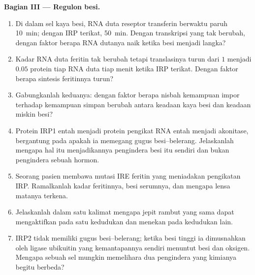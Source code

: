 \begin{problem}
\medskip
\noindent\textbf{Bagian III --- Regulon besi.}
\begin{enumerate}[resume]
  \item Di dalam sel kaya besi, RNA duta reseptor transferin berwaktu
        paruh \qty{10}{min}; dengan IRP terikat, \qty{50}{min}.
        Dengan transkripsi yang tak berubah, dengan faktor berapa RNA
        dutanya naik ketika besi menjadi langka?
  \item Kadar RNA duta feritin tak berubah tetapi translasinya
        turun dari $1$ menjadi $0.05$ protein tiap RNA duta tiap menit
        ketika IRP terikat. Dengan faktor berapa sintesis feritinnya turun?
  \item Gabungkanlah keduanya: dengan faktor berapa nisbah kemampuan impor
        terhadap kemampuan simpan berubah antara keadaan kaya besi dan
        keadaan miskin besi?
  \item Protein IRP1 entah menjadi protein pengikat RNA entah menjadi
        akonitase, bergantung pada apakah ia memegang gugus besi--belerang.
        Jelaskanlah mengapa hal itu menjadikannya pengindera besi itu
        sendiri dan bukan pengindera sebuah hormon.
  \item Seorang pasien membawa mutasi IRE feritin yang meniadakan
        pengikatan IRP. Ramalkanlah kadar feritinnya, besi serumnya, dan
        mengapa lensa matanya terkena.
  \item Jelaskanlah dalam satu kalimat mengapa jepit rambut yang sama dapat
        mengaktifkan pada satu kedudukan dan menekan pada kedudukan lain.
  \item IRP2 tidak memiliki gugus besi--belerang; ketika besi tinggi ia
        dimusnahkan oleh ligase ubikuitin yang kemantapannya sendiri
        menuntut besi dan oksigen. Mengapa sebuah sel mungkin memelihara
        dua pengindera yang kimianya begitu berbeda?
\end{enumerate}


\end{problem}
